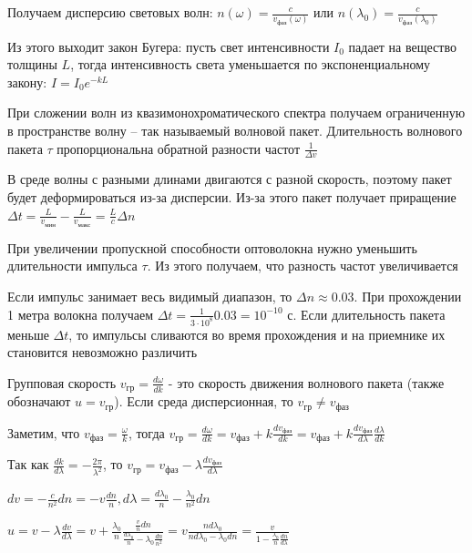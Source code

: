 \documentclass[12pt]{article}
\begin{document}
Получаем дисперсию световых волн: $n(\omega) = \frac{c}{v_{\text{фаз}}(\omega)}$ или $n(\lambda_0) = \frac{c}{v_{\text{фаз}}(\lambda_0)}$

Из этого выходит закон Бугера: пусть свет интенсивности $I_0$ падает на вещество толщины $L$, тогда интенсивность света уменьшается по экспоненциальному закону: $I = I_0 e^{- k L}$

При сложении волн из квазимонохроматического спектра получаем ограниченную в пространстве волну -- так называемый волновой пакет. Длительность волнового пакета $\tau$ пропорциональна обратной разности частот $\frac{1}{\Delta v}$

В среде волны с разными длинами двигаются с разной скорость, поэтому пакет будет деформироваться из-за дисперсии. Из-за этого пакет получает приращение $\Delta t = \frac{L}{v_{\text{мин}}} - \frac{L}{v_{\text{макс}}} = \frac{L}{c} \Delta n$

При увеличении пропускной способности оптоволокна нужно уменьшить длительности импульса $\tau$. Из этого получаем, что разность частот увеличивается

Если импульс занимает весь видимый диапазон, то $\Delta n \approx 0.03$. При прохождении 1 метра волокна получаем $\Delta t = \frac{1}{3 \cdot 10^8} 0.03 = 10^{-10}$ с. Если длительность пакета меньше $\Delta t$, то импульсы сливаются во время прохождения и на приемнике их становится невозможно различить 

Групповая скорость $v_{\text{гр}} = \frac{d\omega}{dk}$ - это скорость движения волнового пакета (также обозначают $u = v_\text{гр}$). Если среда дисперсионная, то $v_{\text{гр}} \neq v_{\text{фаз}}$

Заметим, что $v_{\text{фаз}} = \frac{\omega}{k}$, тогда $v_{\text{гр}} = \frac{d\omega}{dk} = v_{\text{фаз}} + k \frac{d v_{\text{фаз}}}{dk} = v_{\text{фаз}} + k \frac{d v_{\text{фаз}}}{d\lambda} \frac{d\lambda}{dk}$

Так как $\frac{dk}{d\lambda} = -\frac{2\pi}{\lambda^2}$, то $v_{\text{гр}} = v_{\text{фаз}} - \lambda \frac{d v_{\text{фаз}}}{d\lambda}$

$dv = - \frac{c}{n^2} dn = -v \frac{dn}{n}, d\lambda = \frac{d \lambda_0}{n} - \frac{\lambda_0}{n^2} dn$

$u = v - \lambda \frac{dv}{d\lambda} = v + \frac{\lambda_0}{n} \frac{\frac{v}{n} dn}{\frac{d \lambda_0}{n} - \lambda_0 \frac{dn}{n^2}} = v \frac{n d\lambda_0}{n d\lambda_0 - \lambda_0 dn} = \frac{v}{1 - \frac{\lambda_0}{n} \frac{dn}{d\lambda}}$
\end{document}
